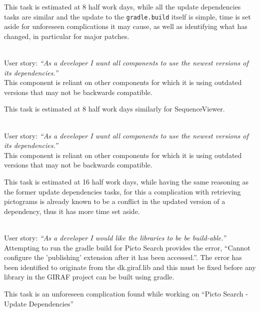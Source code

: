 \begin{description}[style=unboxed]
        This task is estimated at 8 half work days, while all the update dependencies tasks are similar and the update to the \texttt{gradle.build} itself is simple, time is set aside for unforeseen complications it may cause, as well as identifying what has changed, in particular for major patches.
    \item[Sequence - Update dependencies] \hfill \\
        User story: \textit{``As a developer I want all components to use the newest versions of its dependencies.''} \\
        This component is reliant on other components for which it is using outdated versions that may not be backwards compatible.

        This task is estimated at 8 half work days similarly for SequenceViewer.
    \item[Picto Search - Update dependencies] \hfill \\
        User story: \textit{``As a developer I want all components to use the newest versions of its dependencies.''} \\
        This component is reliant on other components for which it is using outdated versions that may not be backwards compatible.

        This task is estimated at 16 half work days, while having the same reasoning as the former update dependencies tasks, for this a complication with retrieving pictograms is already known to be a conflict in the updated version of a dependency, thus it has more time set aside.
    \item[Blocking Task - Custom plugin dk.giraf.lib for gradle breaks build] \hfill \\
        User story: \textit{``As a developer I would like the libraries to be be build-able.''} \\
        Attempting to run the gradle build for Picto Search provides the error, ``Cannot configure the 'publishing' extension after it has been accessed.''. 
        The error has been identified to originate from the dk.giraf.lib and this must be fixed before any library in the GIRAF project can be built using gradle. 

        This task is an unforeseen complication found while working on ``Picto Search - Update Dependencies''
\end{description}
